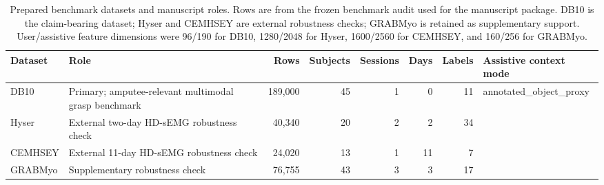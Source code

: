 \begin{table}[!t]
\centering
\caption{Prepared benchmark datasets and manuscript roles. Rows are from the frozen benchmark audit used for the manuscript package. DB10 is the claim-bearing dataset; Hyser and CEMHSEY are external robustness checks; GRABMyo is retained as supplementary support. User/assistive feature dimensions were 96/190 for DB10, 1280/2048 for Hyser, 1600/2560 for CEMHSEY, and 160/256 for GRABMyo.}
\label{tab:datasets}
\footnotesize
\begin{tabular}{p{}p{}rrrrrp{}}
\toprule
Dataset & Role & Rows & Subjects & Sessions & Days & Labels & Assistive context mode \\
\midrule
DB10 & Primary; amputee-relevant multimodal grasp benchmark & 189,000 & 45 & 1 & 0 & 11 & annotated\_object\_proxy \\
Hyser & External two-day HD-sEMG robustness check & 40,340 & 20 & 2 & 2 & 34 &  \\
CEMHSEY & External 11-day HD-sEMG robustness check & 24,020 & 13 & 1 & 11 & 7 &  \\
GRABMyo & Supplementary robustness check & 76,755 & 43 & 3 & 3 & 17 &  \\
\bottomrule
\end{tabular}
\end{table}

